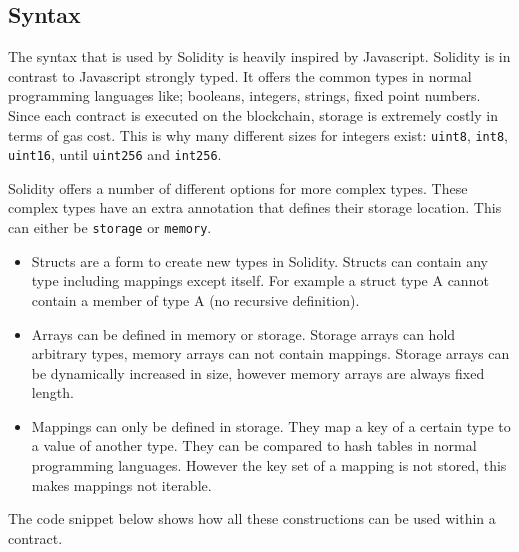 \documentclass[a4paper]{article}
\begin{document}
\subsection{Syntax}
The syntax that is used by Solidity is heavily inspired by Javascript. Solidity is in contrast to Javascript strongly typed. It offers the common types in normal programming languages like; booleans, integers, strings, fixed point numbers. Since each contract is executed on the blockchain, storage is extremely costly in terms of gas cost. This is why many different sizes for integers exist: \texttt{uint8}, \texttt{int8}, \texttt{uint16}, until \texttt{uint256} and \texttt{int256}. \par
Solidity offers a number of different options for more complex types. These complex types have an extra annotation that defines their storage location. This can either be \texttt{storage} or \texttt{memory}. 
\begin{itemize}
    \item Structs are a form to create new types in Solidity. Structs can contain any type including mappings except itself. For example a struct type A cannot contain a member of type A (no recursive definition).  
    \item Arrays can be defined in memory or storage. Storage arrays can hold arbitrary types, memory arrays can not contain mappings. Storage arrays can be dynamically increased in size, however memory arrays are always fixed length.  
    \item Mappings can only be defined in storage. They map a key of a certain type to a value of another type. They can be compared to hash tables in normal programming languages. However the key set of a mapping is not stored, this makes mappings not iterable. 
\end{itemize}
The code snippet below shows how all these constructions can be used within a contract.
\end{document}
